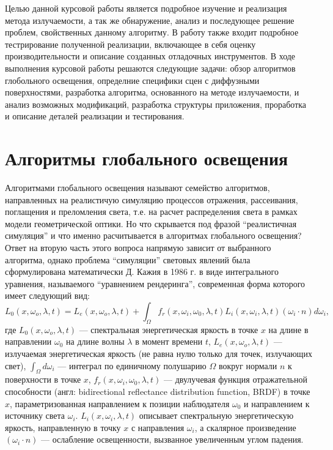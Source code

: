 \documentclass[12pt]{article}
\begin{document}
Целью данной курсовой работы является подробное изучение и реализация метода излучаемости, а так же обнаружение, анализ и последующее решение проблем, свойственных данному алгоритму. В работу также входит подробное тестрирование полученной реализации, включающее в себя оценку производительности и описание созданных отладочных инструментов. В ходе выполнения курсовой работы решаются следующие задачи: обзор алгоритмов глобольного освещения, определние специфики сцен с диффузными поверхностями, разработка алгоритма, основанного на методе излучаемости, и анализ возможных модификаций, разработка структуры приложения, проработка и описание деталей реализации и тестирования.
\newpage\section{Алгоритмы глобального освещения}
Алгоритмами глобального освещения называют семейство алгоритмов, направленных на реалистичую симуляцию процессов отражения, рассеивания, поглащения и преломления света, т.е. на расчет распределения света в рамках модели геометрической оптики. Но что скрывается под фразой ``реалистичная симуляция'' и что именно расчитывается в алгоритмах глобального освещения? Ответ на вторую часть этого вопроса напрямую зависит от выбранного алгоритма, однако проблема ``симуляции'' световых явлений была сформулирована математически Д. Кажия в 1986 г. \cite{Kaj86} в виде интегрального уравнения, называемого ``уравнением рендеринга'', современная форма которого имеет следующий вид:
\begin{equation}
L_0(x, \omega_o, \lambda, t) = L_e(x, \omega_o, \lambda, t) + \int_\Omega f_r(x, \omega_i, \omega_0, \lambda, t) L_i(x, \omega_i, \lambda, t) (\omega_i \cdot n) d\omega_i, \label{eq:kaj}
\end{equation}
где $L_0(x, \omega_o, \lambda, t)$ --- спектральная энергетическая яркость в точке $x$ на длине в направлении $\omega_0$ на длине волны $\lambda$ в момент времени $t$, $L_e(x, \omega_o, \lambda, t)$ --- излучаемая энергетическая яркость (не равна нулю только для точек, излучающих свет), $\int_\Omega d\omega_i$ --- интеграл по единичному полушарию $\Omega$ вокруг нормали $n$ к поверхности в точке $x$, $f_r(x, \omega_i, \omega_0, \lambda, t)$ --- двулучевая функция отражательной способности (англ: bidirectional reflectance distribution function, BRDF) в точке $x$, параметризованная направлением к позиции наблюдателя $\omega_0$ и направлением к источнику света $\omega_i$. $L_i(x, \omega_i, \lambda, t)$ описывает спектральную энергетическую яркость, направленную в точку $x$ с направления $\omega_i$, а скалярное произведение $(\omega_i \cdot n)$ --- ослабление освещенности, вызванное увеличенным углом падения.
\end{document}
